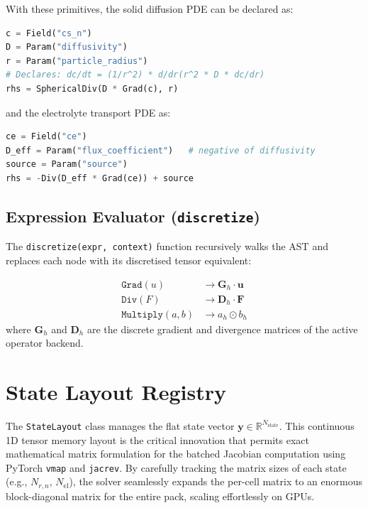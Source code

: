 With these primitives, the solid diffusion PDE can be declared as:

\begin{lstlisting}[language=Python, caption={Declarative PDE for solid diffusion}]
c = Field("cs_n")
D = Param("diffusivity")
r = Param("particle_radius")
# Declares: dc/dt = (1/r^2) * d/dr(r^2 * D * dc/dr)
rhs = SphericalDiv(D * Grad(c), r)
\end{lstlisting}

and the electrolyte transport PDE as:

\begin{lstlisting}[language=Python, caption={Declarative PDE for electrolyte transport}]
ce = Field("ce")
D_eff = Param("flux_coefficient")   # negative of diffusivity
source = Param("source")
rhs = -Div(D_eff * Grad(ce)) + source
\end{lstlisting}

\subsection{Expression Evaluator (\texttt{discretize})}

The \texttt{discretize(expr, context)} function recursively walks the AST and replaces each node with its discretised tensor equivalent:

\begin{align}
  \texttt{Grad}(u) &\rightarrow \mathbf{G}_h \cdot \mathbf{u} \label{eq:discretize_grad}\\
  \texttt{Div}(F) &\rightarrow \mathbf{D}_h \cdot \mathbf{F} \label{eq:discretize_div}\\
  \texttt{Multiply}(a, b) &\rightarrow a_h \odot b_h \label{eq:discretize_mul}
\end{align}
where $\mathbf{G}_h$ and $\mathbf{D}_h$ are the discrete gradient and divergence matrices of the active operator backend.

\section{State Layout Registry}
\label{sec:state_layout}

The \texttt{StateLayout} class manages the flat state vector $\mathbf{y} \in \mathbb{R}^{N_\text{state}}$. This continuous 1D tensor memory layout is the critical innovation that permits exact mathematical matrix formulation for the batched Jacobian computation using PyTorch \texttt{vmap} and \texttt{jacrev}. By carefully tracking the matrix sizes of each state (e.g., $N_{r,n}$, $N_\text{el}$), the solver seamlessly expands the per-cell matrix to an enormous block-diagonal matrix for the entire pack, scaling effortlessly on GPUs.

